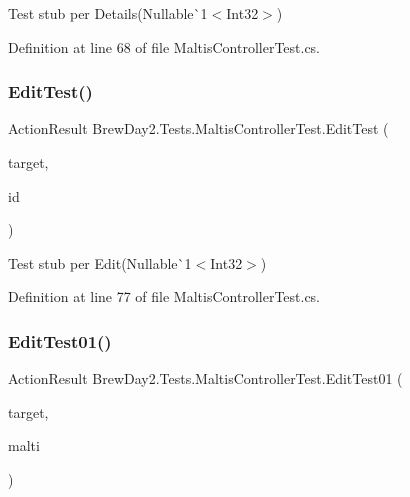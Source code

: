Test stub per Details(Nullable\`{}1$<$Int32$>$)



Definition at line 68 of file Maltis\+Controller\+Test.\+cs.

\mbox{\label{class_brew_day2_1_1_tests_1_1_maltis_controller_test_a68aefd016f69f6691415156cf56f6771}} 
\subsubsection{\texorpdfstring{Edit\+Test()}{EditTest()}}
{\footnotesize\ttfamily Action\+Result Brew\+Day2.\+Tests.\+Maltis\+Controller\+Test.\+Edit\+Test (\begin{DoxyParamCaption}\item[{\mbox{[}\+Pex\+Assume\+Under\+Test\mbox{]} \mbox{\hyperlink{class_brew_day2_1_1_controllers_1_1_maltis_controller}{Maltis\+Controller}}}]{target,  }\item[{int?}]{id }\end{DoxyParamCaption})}



Test stub per Edit(Nullable\`{}1$<$Int32$>$)



Definition at line 77 of file Maltis\+Controller\+Test.\+cs.

\mbox{\label{class_brew_day2_1_1_tests_1_1_maltis_controller_test_a3864963363a863708918f40b2553d1c6}} 
\subsubsection{\texorpdfstring{Edit\+Test01()}{EditTest01()}}
{\footnotesize\ttfamily Action\+Result Brew\+Day2.\+Tests.\+Maltis\+Controller\+Test.\+Edit\+Test01 (\begin{DoxyParamCaption}\item[{\mbox{[}\+Pex\+Assume\+Under\+Test\mbox{]} \mbox{\hyperlink{class_brew_day2_1_1_controllers_1_1_maltis_controller}{Maltis\+Controller}}}]{target,  }\item[{\mbox{\hyperlink{class_brew_day2_1_1_models_1_1_malti}{Malti}}}]{malti }\end{DoxyParamCaption})}




